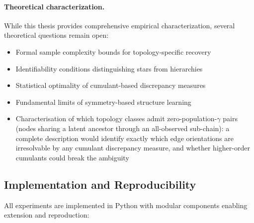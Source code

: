 \documentclass[11pt,a4paper]{article}
\numberwithin{equation}{section}
\begin{document}
\paragraph{Theoretical characterization.} While this thesis provides comprehensive empirical characterization, several theoretical questions remain open:
\begin{itemize}
\item Formal sample complexity bounds for topology-specific recovery
\item Identifiability conditions distinguishing stars from hierarchies
\item Statistical optimality of cumulant-based discrepancy measures
\item Fundamental limits of symmetry-based structure learning
\item Characterisation of which topology classes admit zero-population-$\gamma$ pairs
  (nodes sharing a latent ancestor through an all-observed sub-chain): a complete
  description would identify exactly which edge orientations are irresolvable by any
  cumulant discrepancy measure, and whether higher-order cumulants could break the ambiguity
\end{itemize}

\subsection{Implementation and Reproducibility}

All experiments are implemented in Python with modular components enabling extension and reproduction:
\end{document}
